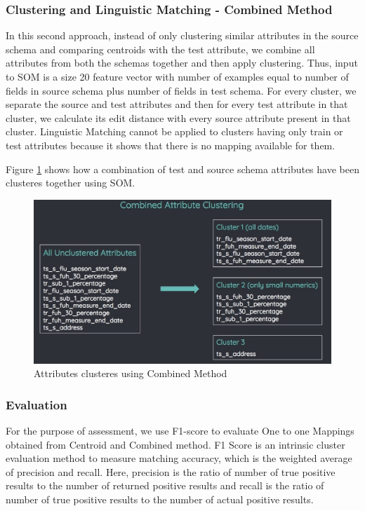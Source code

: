 \documentclass[conference]{IEEEtran}
\begin{document}
\subsubsection*{\textbf{Clustering and Linguistic Matching - Combined Method}}
In this second approach, instead of only clustering similar attributes in the source schema and comparing centroids with the test attribute, we combine all attributes from both the schemas together and then apply clustering. Thus, input to SOM is a size 20 feature vector with number of examples equal to number of fields in source schema plus number of fields in test schema. For every cluster, we separate the source and test attributes and then for every test attribute in that cluster, we calculate its edit distance with every source attribute present in that cluster. Linguistic Matching cannot be applied to clusters having only train or test attributes because it shows that there is no mapping available for them. 

Figure \ref{combined} shows how a combination of test and source schema attributes have been clusteres together using SOM.\\

\begin{figure}
\centering
\includegraphics[scale=0.25]{combined.jpeg}
\caption{Attributes clusteres using Combined Method}
\label{combined}
\end{figure}

\subsubsection*{\textbf{Evaluation}}
For the purpose of assessment, we use F1-score to evaluate One to one Mappings obtained from Centroid and Combined method. F1 Score is an intrinsic cluster evaluation method to measure matching accuracy, which is the weighted average of precision and recall. Here, precision is the ratio of number of true positive results to the number of returned positive results and recall is the ratio of number of true positive results to the number of actual positive results.
\end{document}
